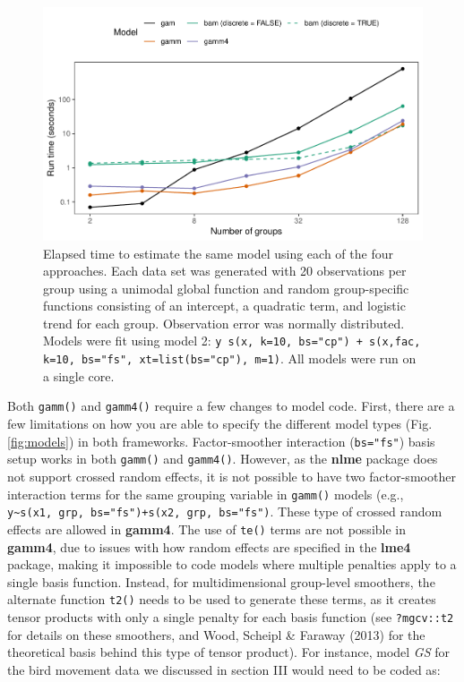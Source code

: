 \documentclass[12pt]{article}
\begin{document}
\begin{figure}
\centering
\includegraphics{../figures/alt_model_timing_plot-1.pdf}
\caption{\label{fig:alt_timing}Elapsed time to estimate the same model
using each of the four approaches. Each data set was generated with 20
observations per group using a unimodal global function and random
group-specific functions consisting of an intercept, a quadratic term,
and logistic trend for each group. Observation error was normally
distributed. Models were fit using model 2:
\texttt{y~s(x, k=10, bs="cp") + s(x,fac, k=10, bs="fs", xt=list(bs="cp"), m=1)}.
All models were run on a single core.}
\end{figure}

Both \texttt{gamm()} and \texttt{gamm4()} require a few changes to model
code. First, there are a few limitations on how you are able to specify
the different model types (Fig. \ref{fig:models}) in both frameworks.
Factor-smoother interaction (\texttt{bs="fs"}) basis setup works in both
\texttt{gamm()} and \texttt{gamm4()}. However, as the \textbf{nlme}
package does not support crossed random effects, it is not possible to
have two factor-smoother interaction terms for the same grouping
variable in \texttt{gamm()} models (e.g.,
\texttt{y\textasciitilde{}s(x1,\ grp,\ bs="fs")+s(x2,\ grp,\ bs="fs")}.
These type of crossed random effects are allowed in \textbf{gamm4}. The
use of \texttt{te()} terms are not possible in \textbf{gamm4}, due to
issues with how random effects are specified in the \textbf{lme4}
package, making it impossible to code models where multiple penalties
apply to a single basis function. Instead, for multidimensional
group-level smoothers, the alternate function \texttt{t2()} needs to be
used to generate these terms, as it creates tensor products with only a
single penalty for each basis function (see \texttt{?mgcv::t2} for
details on these smoothers, and Wood, Scheipl \& Faraway (2013) for the
theoretical basis behind this type of tensor product). For instance,
model \emph{GS} for the bird movement data we discussed in section III
would need to be coded as:
\end{document}
